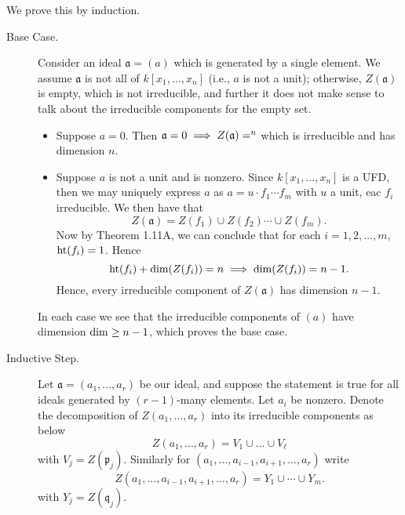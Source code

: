 \documentclass{/Users/SHER/Documents/Hartshorne-Exercises/hw_pset} %
\DeclareMathOperator{\Ht}{\rm{ht}}    %
\DeclareMathOperator{\Dim}{\rm{dim}}  %
\let\aa\relax
\DeclareMathOperator{\aa}{\mathbf{A}} %
\newcommand{\x}{x_1, \dots, x_n}    %
\newcommand{\idl}[1]{\mathfrak{#1}} %
\begin{document}
\begin{solution}
    We prove this by induction. 
    \begin{description}
        \item[Base Case.] Consider an ideal $\idl{a} = (a)$ which 
        is generated by a single element. We assume $\idl{a}$ is not all of $k[\x]$ (i.e., $a$ is not a unit);
        otherwise, $Z(\idl{a})$ is empty, which is not irreducible, and further 
        it does not make sense to talk about the irreducible components for the empty set. 
        \begin{itemize}
            \item Suppose $a = 0$. Then $\idl{a} = 0 \implies Z(\idl{a}) = \aa^n$ which is irreducible 
            and has dimension $n$.

            \item Suppose $a$ is not a unit and is nonzero. Since $k[\x]$ is a UFD, then 
            we may uniquely express $a$ as $a = u\cdot f_1 \cdots f_m$ with $u$ a unit, eac 
            $f_i$ irreducible. We then have that 
            \[
                Z(\idl{a}) = Z(f_1) \cup Z(f_2) \cdots \cup Z(f_m).
            \]
            Now by Theorem 1.11A, we can conclude that for each $i= 1, 2, \dots, m$, 
            $\Ht(f_i) = 1$. Hence 
            \[
                \Ht(f_i) + \Dim(Z(f_i)) = n \implies \Dim(Z(f_i)) = n - 1.
            \]
            Hence, every irreducible component of $Z(\idl{a})$ has dimension $n - 1$.
        \end{itemize}
        In each case we see that the irreducible components of $(a)$ have dimension 
        $\Dim \ge n - 1$, which proves the base case. 

        \item[Inductive Step.]
        Let $\idl{a} = (a_1, \dots, a_r)$ be our ideal, and suppose the statement 
        is true for all ideals generated by $(r-1)$-many elements. Let $a_i$ be nonzero.
        Denote the decomposition of $Z(a_1, \dots, a_r)$ into its irreducible components as below 
        \[
            Z(a_1, \dots, a_r) = V_1 \cup \dots \cup V_{\ell}
        \]
        with $V_j = Z(\idl{p}_j)$.
        Similarly for $(a_1, \dots, a_{i-1}, a_{i+1}, \dots, a_r)$ write
        \[
            Z(a_1, \dots, a_{i-1}, a_{i+1}, \dots, a_r) = Y_1 \cup \cdots \cup Y_m.
        \]
        with $Y_j = Z(\idl{q}_j)$. 


\end{description}
\end{solution}
\end{document}
